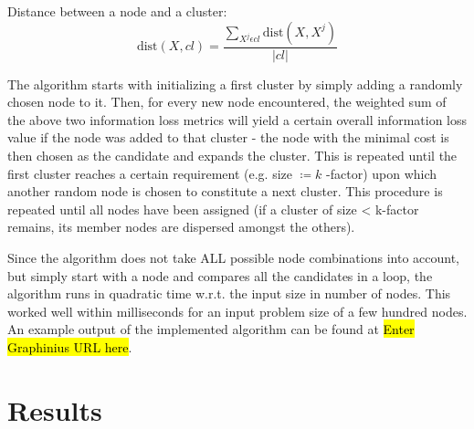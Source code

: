 \documentclass{llncs}
\providecommand{\abs}[1]{\lvert#1\rvert}
\begin{document}
\begin{enumerate}
	Distance between a node and a cluster:
	\begin{equation*}
	\text{dist}(X, cl) = \frac{\sum_{X^j \epsilon cl} \text{dist}(X, X^j) }{\abs{cl}}
	\end{equation*}
\end{enumerate}

The algorithm starts with initializing a first cluster by simply adding a randomly chosen node to it. Then, for every new node encountered, the weighted sum of the above two information loss metrics will yield a certain overall information loss value if the node was added to that cluster - the node with the minimal cost is then chosen as the candidate and expands the cluster. This is repeated until the first cluster reaches a certain requirement (e.g. size $ \coloneqq  k $ -factor) upon which another random node is chosen to constitute a next cluster. This procedure is repeated until all nodes have been assigned (if a cluster of size < k-factor remains, its member nodes are dispersed amongst the others). 

Since the algorithm does not take ALL possible node combinations into account, but simply start with a node and compares all the candidates in a loop, the algorithm runs in quadratic time w.r.t. the input size in number of nodes. This worked well within milliseconds for an input problem size of a few hundred nodes. An example output of the implemented algorithm can be found at \hl{Enter Graphinius URL here}. \\


\section{Results}
\label{sect:results}
\end{document}
